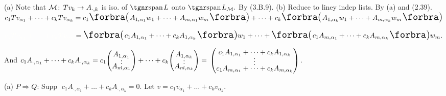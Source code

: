 (a) Note that $\mathcal{M}\!:\,Tv_k\rightarrow A_{\cdot,k}$ is iso. of $\spn L$ onto $\spn L_{\mM}.$ By (3.B.9).\parSol{}
(b) Reduce to liney indep lists. By (a) and (2.39).\PfEnd\vspace{4pt}\quad
\Or\;$c_1Tv_{\alpha_1}+\dots+c_kTv_{\alpha_k}=c_1\BigPar{A_{1,{\alpha_1}}w_1+\dots+A_{m,{\alpha_1}}w_m}+\dots+c_k\BigPar{A_{1,{\alpha_k}}w_1+\dots+A_{m,{\alpha_k}}w_m}$\par\vspace{2pt}\quad
\Blind{\Or\;}$\Blind{c_1Tv_{\alpha_1}+\dots+c_kTv_{\alpha_k}}=\BigPar{c_1A_{1,{\alpha_1}}+\dots+c_kA_{1,{\alpha_k}}}w_1+\dots+\BigPar{c_1A_{m,{\alpha_1}}+\dots+c_kA_{m,{\alpha_k}}}w_m.$\par\vspace{4pt}\quad
\Blind{\Or\;}And \;$c_1A_{\cdot,{\alpha_1}}+\dots+c_kA_{\cdot,{\alpha_k}}=c_1{\normalsize\begin{pmatrix}A_{1,{\alpha_1}}\\[-4pt]\vdots\\[-10pt]A_{m,{\alpha_1}}\end{pmatrix}}+\dots+c_k{\normalsize\begin{pmatrix}A_{1,{\alpha_k}}\\[-4pt]\vdots\\[-10pt]A_{m,{\alpha_k}}\end{pmatrix}}{}={}\normalsize\begin{pmatrix}c_1 A_{1,{\alpha_1}}+\dots+c_kA_{1,{\alpha_k}}\\[-4pt]\vdots\\[-4pt]c_1A_{m,{\alpha_1}}+\dots+c_kA_{m,{\alpha_k}}\end{pmatrix}$.\par\vspace{6pt}\quad
(a) $P\Rightarrow Q:$\,\;Supp $\;c_1A_{\cdot,{\alpha_1}}+\dots+c_kA_{\cdot,{\alpha_k}}=0.$ \;Let $v=c_1v_{\alpha_1}+\dots+c_kv_{\alpha_k}.$\par\quad\Ha
